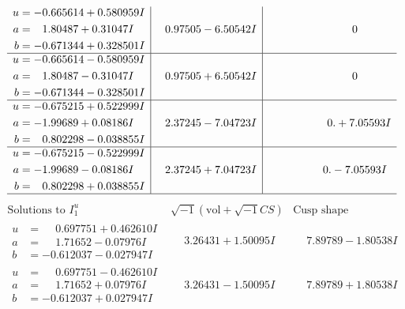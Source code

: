 \documentclass[1p]{elsarticle_modified}
\theoremstyle{definition}
\newcommand{\I}{\sqrt{-1}}
\begin{document}
$$\begin{array}{c|c|c}
\begin{aligned}
u &= -0.665614 + 0.580959 I \\
a &= \phantom{-}1.80487 + 0.31047 I \\
b &= -0.671344 + 0.328501 I\end{aligned}
 & \phantom{-}0.97505 - 6.50542 I & \phantom{-0.000000 } 0 \\ \hline\begin{aligned}
u &= -0.665614 - 0.580959 I \\
a &= \phantom{-}1.80487 - 0.31047 I \\
b &= -0.671344 - 0.328501 I\end{aligned}
 & \phantom{-}0.97505 + 6.50542 I & \phantom{-0.000000 } 0 \\ \hline\begin{aligned}
u &= -0.675215 + 0.522999 I \\
a &= -1.99689 + 0.08186 I \\
b &= \phantom{-}0.802298 - 0.038855 I\end{aligned}
 & \phantom{-}2.37245 - 7.04723 I & \phantom{-0.000000 -}0. + 7.05593 I \\ \hline\begin{aligned}
u &= -0.675215 - 0.522999 I \\
a &= -1.99689 - 0.08186 I \\
b &= \phantom{-}0.802298 + 0.038855 I\end{aligned}
 & \phantom{-}2.37245 + 7.04723 I & \phantom{-0.000000 } 0. - 7.05593 I\\
 \hline 
 \end{array}$$\newpage$$\begin{array}{c|c|c}  
\text{Solutions to }I^u_{1}& \I (\text{vol} + \sqrt{-1}CS) & \text{Cusp shape}\\
 \hline 
\begin{aligned}
u &= \phantom{-}0.697751 + 0.462610 I \\
a &= \phantom{-}1.71652 - 0.07976 I \\
b &= -0.612037 - 0.027947 I\end{aligned}
 & \phantom{-}3.26431 + 1.50095 I & \phantom{-}7.89789 - 1.80538 I \\ \hline\begin{aligned}
u &= \phantom{-}0.697751 - 0.462610 I \\
a &= \phantom{-}1.71652 + 0.07976 I \\
b &= -0.612037 + 0.027947 I\end{aligned}
 & \phantom{-}3.26431 - 1.50095 I & \phantom{-}7.89789 + 1.80538 I \\ \hline\begin{aligned}

\end{aligned}
\end{array}$$
\end{document}
